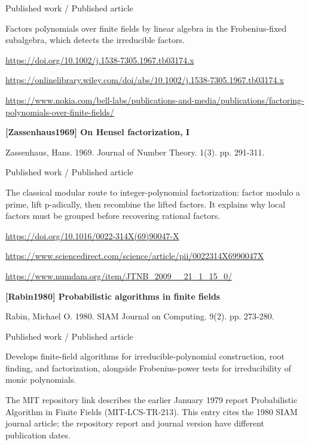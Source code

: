 \documentclass[11pt,a4paper,oneside,openany]{book}
\begin{document}
{\small\sffamily\color{atlasgold}Published work / Published article}\par
\color{black} Factors polynomials over finite fields by linear algebra in the Frobenius-fixed subalgebra, which detects the irreducible factors.\par
{\footnotesize\url{https://doi.org/10.1002/j.1538-7305.1967.tb03174.x}}\par
{\footnotesize\url{https://onlinelibrary.wiley.com/doi/abs/10.1002/j.1538-7305.1967.tb03174.x}}\par
{\footnotesize\url{https://www.nokia.com/bell-labs/publications-and-media/publications/factoring-polynomials-over-finite-fields/}}\par
\vspace{9pt}
\hypertarget{ref:Zassenhaus1969}{}
{\sffamily\bfseries\color{atlasgreen}[Zassenhaus1969] On Hensel factorization, I}\par
\color{black} Zassenhaus, Hans. 1969. Journal of Number Theory. 1(3). pp. 291-311.\par
{\small\sffamily\color{atlasgold}Published work / Published article}\par
\color{black} The classical modular route to integer-polynomial factorization: factor modulo a prime, lift p-adically, then recombine the lifted factors. It explains why local factors must be grouped before recovering rational factors.\par
{\footnotesize\url{https://doi.org/10.1016/0022-314X(69)90047-X}}\par
{\footnotesize\url{https://www.sciencedirect.com/science/article/pii/0022314X6990047X}}\par
{\footnotesize\url{https://www.numdam.org/item/JTNB_2009__21_1_15_0/}}\par
\vspace{9pt}
\hypertarget{ref:Rabin1980}{}
{\sffamily\bfseries\color{atlasgreen}[Rabin1980] Probabilistic algorithms in finite fields}\par
\color{black} Rabin, Michael O. 1980. SIAM Journal on Computing. 9(2). pp. 273-280.\par
{\small\sffamily\color{atlasgold}Published work / Published article}\par
\color{black} Develops finite-field algorithms for irreducible-polynomial construction, root finding, and factorization, alongside Frobenius-power tests for irreducibility of monic polynomials.\par
{\small The MIT repository link describes the earlier January 1979 report Probabilistic Algorithm in Finite Fields (MIT-LCS-TR-213). This entry cites the 1980 SIAM journal article; the repository report and journal version have different publication dates.}\par
\end{document}

